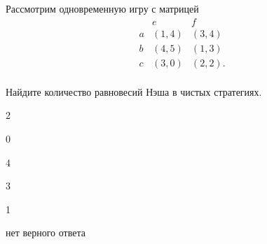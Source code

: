 
\begin{question}
Рассмотрим одновременную игру с матрицей
\[
\begin{matrix}
   & e & f \\
a  & (1, 4) & (3, 4) \\
b  & (4, 5) & (1, 3) \\
c  & (3, 0)          & (2, 2). \\
\end{matrix}
\]

Найдите количество равновесий Нэша в чистых стратегиях.
\begin{answerlist}
  \item 2
  \item 0
  \item 4
  \item 3
  \item 1
  \item нет верного ответа
\end{answerlist}
\end{question}


